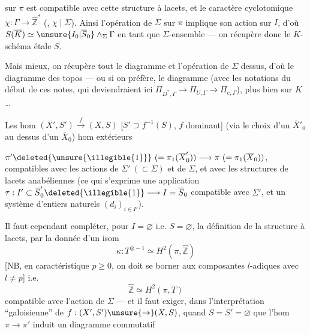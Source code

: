 
   sur $\pi$ est
compatible avec cette structure à lacets,
et le caractère cyclotomique $\chi:\Gamma\to\widehat{\mathbb Z}^{*}$
(, $\chi\mid\Sigma$). Ainsi l'opération de
$\Sigma$ sur $\pi$ implique son action sur $I$, d'où
$S(\overline K)\simeq\unsure{I_0|\overline S_0}\wedge_{\Sigma}\Gamma$ en tant que $\Sigma$-ensemble
--- on récupère donc le $K$-schéma étale $S$.

Mais mieux, on récupère tout le
diagramme
et l'opération de $\Sigma$ dessus, d'où le
diagramme des topos  --- ou si
on préfère, le diagramme
(avec les notations du début de ces notes,
qui deviendraient ici $\Pi_{D^{*},\Gamma}\to\Pi_{U,\Gamma}\to\Pi_{e,\Gamma}$),
plus bien sur $K$\dots

Les hom $(X',S')\xrightarrow{f}(X,S)$
[$S'\supset f^{-1}(S)$, $f$ dominant]  
  (via le choix d'un $\overline X'_0$
au dessus d'un $\overline X_0$)   hom extérieurs



$\pi'\deleted{\unsure{\illegible{1}}}\ (=\pi_1(\overline X'_0))\longrightarrow\pi\ (=\pi_1(\overline X_0))$, compatibles
avec les actions de $\Sigma'\ (\subset\Sigma)$ et de $\Sigma$,
et avec les structures de lacets anabéliennes
(ce qui s'exprime   une application
$\tau:I'\subset\overline S'_0\deleted{\illegible{1}}\longrightarrow I=\overline S_0$ compatible avec
$\Sigma'$, et un système d'entiers naturels
$(d_i)_{i\in I'}$).

Il faut cependant compléter,  pour
$I=\varnothing$ i.e. $S=\varnothing$, la définition de la
structure à lacets, par la donnée d'un
isom
\[
\kappa:T^{\otimes-1}\simeq H^2(\pi,\widehat{\mathbb Z})
\]
[NB, en caractéristique $p\geq0$, on doit se borner
aux composantes $l$-adiques avec $l\ne p$]
i.e.
\[
\widehat{\mathbb Z}\simeq H^2(\pi,T)
\]
compatible avec l'action de $\Sigma$
--- et il faut exiger, dans l'interprétation
``galoisienne'' de $f:(X',S')\unsure{\to}(X,S)$, quand $S=S'=\varnothing$
que l'hom $\pi\to\pi'$ induit un
diagramme commutatif

